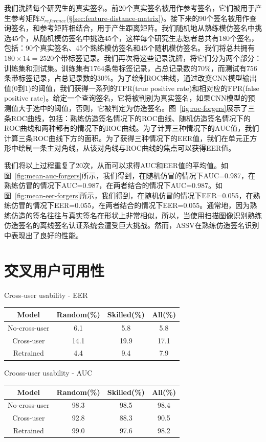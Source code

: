 我们洗牌每个研究生的真实签名。前20个真实签名被用作参考签名，它们被用于产生参考矩阵$S_{reference}$(\S\ref{sec:feature-distance-matrix})。接下来的90个签名被用作查询签名，和参考矩阵相结合，用于产生距离矩阵。我们随机地从熟练模仿签名中挑选45个，从随机模仿签名中挑选45个，这样每个研究生志愿者总共有180个签名，包括：90个真实签名、45个熟练模仿签名和45个随机模仿签名。我们将总共拥有$180\times 14=2520$个带标签记录。我们再次将这些记录洗牌，将它们分为两个部分：训练集和测试集。训练集有1764条带标签记录，占总记录数的70\%，而测试有756条带标签记录，占总记录数的30\%。为了绘制ROC曲线，通过改变CNN模型输出值(0到1)的阈值，我们获得一系列的TPR(true positive rate)和相对应的FPR(false positive rate)。给定一个查询签名，它将被判别为真实签名，如果CNN模型的预测值大于选中的阈值，否则，它被判定为仿造签名。图~\ref{fig:roc-forgers}展示了三条ROC曲线，包括：熟练仿造签名情况下的ROC曲线、随机仿造签名情况下的ROC曲线和两种都有的情况下的ROC曲线。为了计算三种情况下的AUC值，我们计算三条ROC曲线下方的面积。为了获得三种情况下的EER值，我们在单元正方形中绘制一条主对角线，从该对角线与ROC曲线的焦点可以获得EER值。

我们将以上过程重复了20次，从而可以求得AUC和EER值的平均值。如图~\ref{fig:mean-auc-forgers}所示，我们得到，在随机仿冒的情况下AUC=0.987，在熟练仿冒的情况下AUC=0.987，在两者结合的情况下AUC=0.987。如图~\ref{fig:mean-eer-forgers}所示，我们得到，在随机仿冒的情况下EER=0.055，在熟练仿冒的情况下EER=0.055，在两者结合的情况下EER=0.055。通常地，因为熟练仿造的签名往往与真实签名在形状上非常相似，所以，当使用扫描图像识别熟练仿造签名的离线签名认证系统会遭受巨大挑战。然而，ASSV在熟练仿造签名识别中表现出了良好的性能。

\section{交叉用户可用性}

\begin{table}[ht]
  \centering
    {Cross-user usability - EER}
    \label{table:cross-eer}
    \begin{tabular}{c c c c}
      \hline\hline 
      Model & Random(\%) & Skilled(\%) & All(\%) \\ 
      \hline 
      No-cross-user & 6.1 & 5.8 & 5.8 \\
      Cross-user & 14.1 & 19.9 & 17.1 \\
      Retrained & 4.4 & 9.4 & 7.9 \\
      \hline 
    \end{tabular}
\end{table}
\begin{table}[ht]
  \centering
  {Crooss-user usability - AUC} 
  \label{table:cross-auc} 
  \begin{tabular}{c c c c} 
    \hline\hline 
    Model & Random(\%) & Skilled(\%) & All(\%) \\ 
    \hline 
    No-cross-user & 98.3 & 98.5 & 98.4 \\
    Cross-user & 92.8 & 88.3 & 90.5 \\
    Retrained & 99.0 & 97.6 & 98.2 \\
    \hline 
  \end{tabular}
\end{table}


